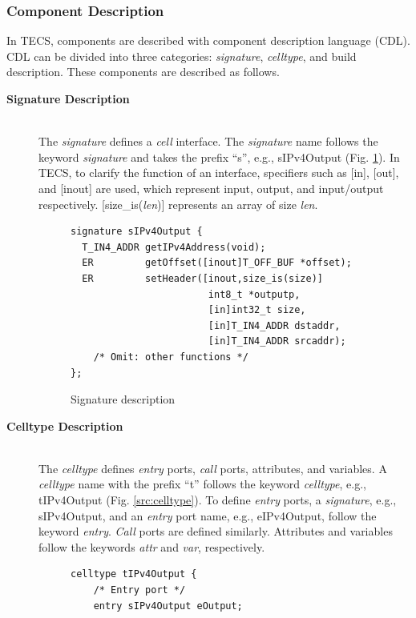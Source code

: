 \documentclass[conference]{IEEEtran/IEEEtran}
\begin{document}
\subsubsection{Component Description}

In TECS, components are described with component description language (CDL).
CDL can be divided into three categories: {\it signature}, {\it celltype}, and build description.
These components are described as follows.

\begin{description}
    \item[{\bf Signature Description}]\mbox{}\\
        The {\it signature} defines a {\it cell} interface.
        The {\it signature} name follows the keyword {\it signature} and takes the prefix ``s'', e.g., sIPv4Output (Fig. \ref{src:signature}).
        In TECS, to clarify the function of an interface, specifiers such as [in], [out], and [inout] are used, which represent input, output, and input/output respectively.
        [size\_is({\it len})] represents an array of size {\it len}.
\begin{figure}[t]
\centering
\begin{lstlisting}
signature sIPv4Output {
  T_IN4_ADDR getIPv4Address(void);
  ER         getOffset([inout]T_OFF_BUF *offset);
  ER         setHeader([inout,size_is(size)]
                        int8_t *outputp,
                        [in]int32_t size,
                        [in]T_IN4_ADDR dstaddr,
                        [in]T_IN4_ADDR srcaddr);
    /* Omit: other functions */
};
\end{lstlisting}
\caption{Signature description}
\label{src:signature}
\end{figure}
    \item[{\bf Celltype Description}]\mbox{}\\
        The {\it celltype} defines {\it entry} ports, {\it call} ports, attributes, and variables.
        A {\it celltype} name with the prefix ``t'' follows the keyword {\it celltype}, e.g., tIPv4Output (Fig. \ref{src:celltype}).
        To define {\it entry} ports, a {\it signature}, e.g., sIPv4Output, and an {\it entry} port name, e.g., eIPv4Output, follow the keyword {\it entry}.
        {\it Call} ports are defined similarly.
        Attributes and variables follow the keywords {\it attr} and {\it var}, respectively.
\begin{figure}[t]
\centering
\begin{lstlisting}
celltype tIPv4Output {
    /* Entry port */
    entry sIPv4Output eOutput;


\end{lstlisting}
\end{figure}
\end{description}
\end{document}
